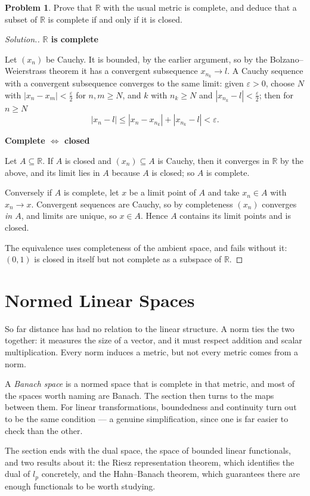 \documentclass[11pt,a4paper]{article}
\theoremstyle{definition}
\newtheorem{problemx}{Problem}[section]
\newenvironment{problem}{\begin{problemx}}{\end{problemx}}
\newenvironment{solution}
  {\renewcommand{\qedsymbol}{}\begin{proof}[\textit{Solution}.]}
  {\end{proof}}
\newcommand{\subhead}[1]{%
  \par\medskip\noindent\textbf{#1}\par\nobreak\smallskip}
\begin{document}
\begin{problem}
Prove that $\mathbb{R}$ with the usual metric is complete, and deduce that a
subset of $\mathbb{R}$ is complete if and only if it is closed.
\end{problem}
\begin{solution}
\subhead{$\mathbb{R}$ is complete}
Let $(x_n)$ be Cauchy. It is bounded, by the earlier argument, so by the
Bolzano--Weierstrass theorem it has a convergent subsequence
$x_{n_k}\rightarrow l$. A Cauchy sequence with a convergent subsequence
converges to the same limit: given $\varepsilon>0$, choose $N$ with
$|x_n-x_m|<\frac{\varepsilon}{2}$ for $n,m\geq N$, and $k$ with $n_k\geq N$ and
$|x_{n_k}-l|<\frac{\varepsilon}{2}$; then for $n\geq N$
$$|x_n-l|\leq|x_n-x_{n_k}|+|x_{n_k}-l|<\varepsilon .$$

\subhead{Complete $\iff$ closed}
Let $A\subseteq\mathbb{R}$. If $A$ is closed and $(x_n)\subseteq A$ is Cauchy,
then it converges in $\mathbb{R}$ by the above, and its limit lies in $A$
because $A$ is closed; so $A$ is complete.

Conversely if $A$ is complete, let $x$ be a limit point of $A$ and take
$x_n\in A$ with $x_n\rightarrow x$. Convergent sequences are Cauchy, so by
completeness $(x_n)$ converges \emph{in $A$}, and limits are unique, so
$x\in A$. Hence $A$ contains its limit points and is closed.

The equivalence uses completeness of the ambient space, and fails without it:
$(0,1)$ is closed in itself but not complete as a subspace of $\mathbb{R}$.
\end{solution}


\section{Normed Linear Spaces}
So far distance has had no relation to the linear structure. A norm ties the
two together: it measures the size of a vector, and it must respect addition and
scalar multiplication. Every norm induces a metric, but not every metric comes
from a norm.

A \emph{Banach space} is a normed space that is complete in that metric, and
most of the spaces worth naming are Banach. The section then turns to the maps
between them. For linear transformations, boundedness and continuity turn out to
be the same condition --- a genuine simplification, since one is far easier to
check than the other.

The section ends with the dual space, the space of bounded linear functionals,
and two results about it: the Riesz representation theorem, which identifies the
dual of $l_p$ concretely, and the Hahn--Banach theorem, which guarantees there
are enough functionals to be worth studying.
\end{document}
